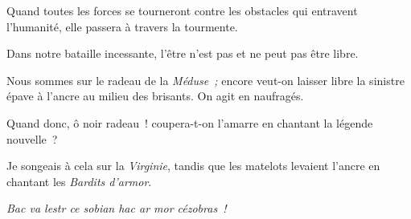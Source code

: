 \documentclass[french,twoside]{book} %
\begin{document}
Quand toutes les forces se tourneront contre les obstacles qui entravent l’humanité, elle passera à travers la tourmente.\par
Dans notre bataille incessante, l’être n’est pas et ne peut pas être libre.\par
Nous sommes sur le radeau de la \emph{Méduse ;} encore veut-on laisser libre la sinistre épave à l’ancre au milieu des brisants. On agit en naufragés.\par
Quand donc, ô noir radeau ! coupera-t-on l’amarre en chantant la légende nouvelle ?\par
Je songeais à cela sur la \emph{Virginie}, tandis que les matelots levaient l’ancre en chantant les \emph{Bardits d’armor}.\par

\emph{Bac va lestr ce sobian hac ar mor cézobras !}\\
\end{document}
